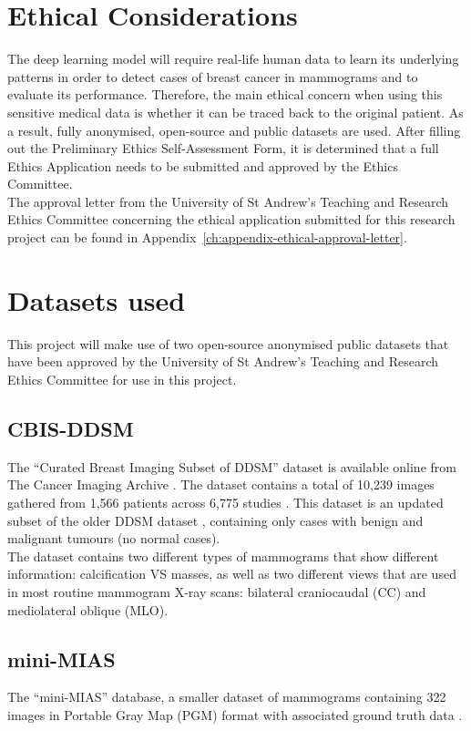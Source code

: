 \section{Ethical Considerations}

The deep learning model will require real-life human data to learn its underlying patterns in order to detect cases of breast cancer in mammograms and to evaluate its performance. Therefore, the main ethical concern when using this sensitive medical data is whether it can be traced back to the original patient. As a result, fully anonymised, open-source and public datasets are used. After filling out the Preliminary Ethics Self-Assessment Form, it is determined that a full Ethics Application needs to be submitted and approved by the Ethics Committee.\\

The approval letter from the University of St Andrew's Teaching and Research Ethics Committee concerning the ethical application submitted for this research project can be found in Appendix~\ref{ch:appendix-ethical-approval-letter}.


\section{Datasets used}

This project will make use of two open-source anonymised public datasets that have been approved by the University of St Andrew's Teaching and Research Ethics Committee for use in this project.

\subsection{CBIS-DDSM}

The ``Curated Breast Imaging Subset of DDSM'' dataset \citep{Lee2017} is available online from The Cancer Imaging Archive \citep{Clark2013}. The dataset contains a total of 10,239 images gathered from 1,566 patients across 6,775 studies \citep{Lee2017}. This dataset is an updated subset of the older DDSM dataset \citep{DDSMdataset2001}, containing only cases with benign and malignant tumours (no normal cases).\\

The dataset contains two different types of mammograms that show different information: calcification VS masses, as well as two different views that are used in most routine mammogram X-ray scans: bilateral craniocaudal (CC) and mediolateral oblique (MLO). 

\subsection{mini-MIAS}

The ``mini-MIAS'' database, a smaller dataset of mammograms containing 322 images in Portable Gray Map (PGM) format with associated ground truth data \citep{Suckling1994}.